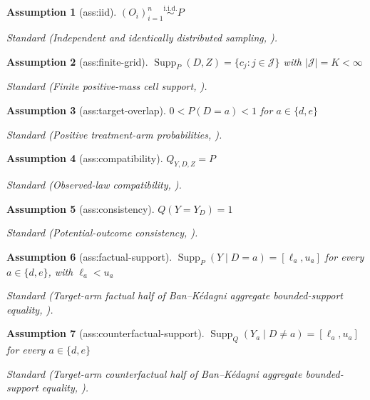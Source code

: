 \documentclass{article}
\newtheorem{assumption}{Assumption}
\begin{document}
\begin{assumption}[ass:iid]\label{ass:iid}
\((O_i)_{i=1}^n\stackrel{\mathrm{i.i.d.}}{\sim}P\)
\par\smallskip\noindent\emph{Standard} (Independent and identically distributed sampling, \cite{BanKedagni2022}).
\end{assumption}

\begin{assumption}[ass:finite-grid]\label{ass:finite-grid}
\(\operatorname{Supp}_P(D,Z)=\{c_j:j\in\mathcal J\}\) with \(|\mathcal J|=K<\infty\)
\par\smallskip\noindent\emph{Standard} (Finite positive-mass cell support, \cite{BanKedagni2022}).
\end{assumption}

\begin{assumption}[ass:target-overlap]\label{ass:target-overlap}
\(0<P(D=a)<1\) for \(a\in\{d,e\}\)
\par\smallskip\noindent\emph{Standard} (Positive treatment-arm probabilities, \cite{BanKedagni2022}).
\end{assumption}

\begin{assumption}[ass:compatibility]\label{ass:compatibility}
\(Q_{Y,D,Z}=P\)
\par\smallskip\noindent\emph{Standard} (Observed-law compatibility, \cite{Manski1990}).
\end{assumption}

\begin{assumption}[ass:consistency]\label{ass:consistency}
\(Q(Y=Y_D)=1\)
\par\smallskip\noindent\emph{Standard} (Potential-outcome consistency, \cite{BanKedagni2022}).
\end{assumption}

\begin{assumption}[ass:factual-support]\label{ass:factual-support}
\(\operatorname{Supp}_P(Y\mid D=a)=[\ell_a,u_a]\) for every \(a\in\{d,e\}\), with \(\ell_a<u_a\)
\par\smallskip\noindent\emph{Standard} (Target-arm factual half of Ban--Kédagni aggregate bounded-support equality, \cite{BanKedagni2022}).
\end{assumption}

\begin{assumption}[ass:counterfactual-support]\label{ass:counterfactual-support}
\(\operatorname{Supp}_Q(Y_a\mid D\ne a)=[\ell_a,u_a]\) for every \(a\in\{d,e\}\)
\par\smallskip\noindent\emph{Standard} (Target-arm counterfactual half of Ban--Kédagni aggregate bounded-support equality, \cite{BanKedagni2022}).
\end{assumption}
\end{document}
